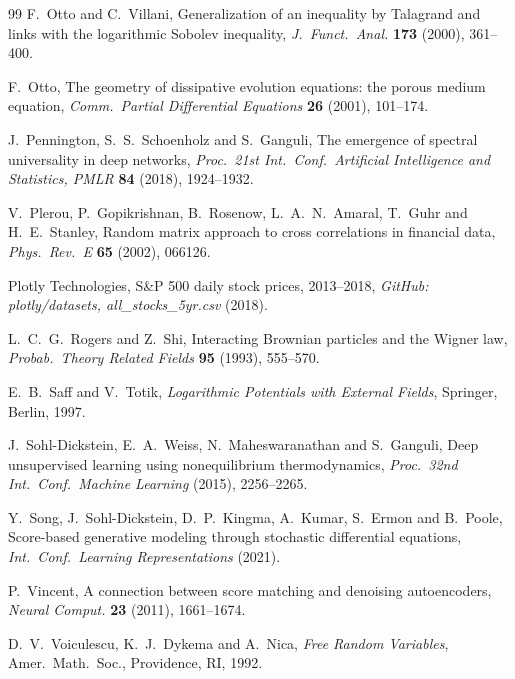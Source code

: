 \documentclass[11pt]{article}
\theoremstyle{plain}
\theoremstyle{definition}
\theoremstyle{remark}
\begin{document}
\begin{singlespace}
\begin{thebibliography}{99}
F.~Otto and C.~Villani,
Generalization of an inequality by Talagrand and links with the logarithmic Sobolev
inequality, \emph{J.\ Funct.\ Anal.} \textbf{173} (2000), 361--400.

F.~Otto,
The geometry of dissipative evolution equations: the porous medium equation,
\emph{Comm.\ Partial Differential Equations} \textbf{26} (2001), 101--174.

J.~Pennington, S.~S.~Schoenholz and S.~Ganguli,
The emergence of spectral universality in deep networks,
\emph{Proc.\ 21st Int.\ Conf.\ Artificial Intelligence and Statistics, PMLR}
\textbf{84} (2018), 1924--1932.

V.~Plerou, P.~Gopikrishnan, B.~Rosenow, L.~A.~N.~Amaral, T.~Guhr and H.~E.~Stanley,
Random matrix approach to cross correlations in financial data,
\emph{Phys.\ Rev.\ E} \textbf{65} (2002), 066126.

Plotly Technologies,
S\&P 500 daily stock prices, 2013--2018,
\emph{GitHub: plotly/datasets, all\_stocks\_5yr.csv} (2018).

L.~C.~G.~Rogers and Z.~Shi,
Interacting Brownian particles and the Wigner law,
\emph{Probab.\ Theory Related Fields} \textbf{95} (1993), 555--570.

E.~B.~Saff and V.~Totik,
\emph{Logarithmic Potentials with External Fields}, Springer, Berlin, 1997.

J.~Sohl-Dickstein, E.~A.~Weiss, N.~Maheswaranathan and
S.~Ganguli, Deep unsupervised learning using nonequilibrium thermodynamics,
\emph{Proc.\ 32nd Int.\ Conf.\ Machine Learning} (2015), 2256--2265.

Y.~Song, J.~Sohl-Dickstein, D.~P.~Kingma, A.~Kumar, S.~Ermon and
B.~Poole, Score-based generative modeling through stochastic differential equations,
\emph{Int.\ Conf.\ Learning Representations} (2021).

P.~Vincent,
A connection between score matching and denoising autoencoders,
\emph{Neural Comput.} \textbf{23} (2011), 1661--1674.

D.~V.~Voiculescu, K.~J.~Dykema and A.~Nica,
\emph{Free Random Variables}, Amer.\ Math.\ Soc., Providence, RI, 1992.


\end{thebibliography}
\end{singlespace}
\end{document}

